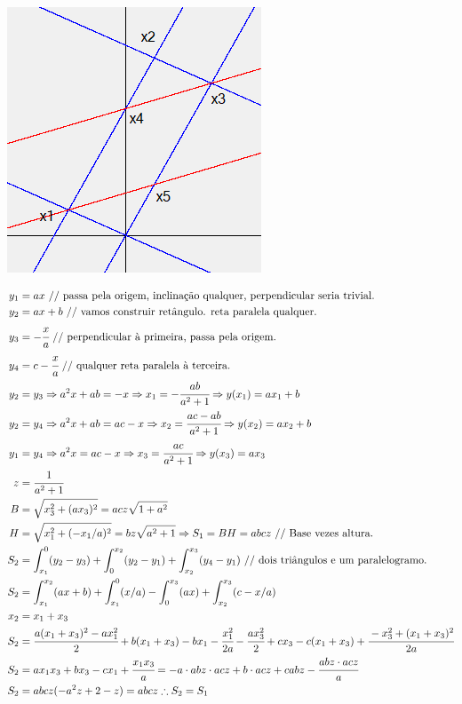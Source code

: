 \documentclass[12pt]{article}
\begin{document}
		\begin{center}
		\includegraphics{restrita}
		\end{center}

\begin{align}
y_1 &= ax \text{ // passa pela origem, inclina\c{c}\~ao qualquer, perpendicular seria trivial.} \\
y_2 &= ax + b \text{ // vamos construir ret\^angulo. reta paralela qualquer.} \\
y_3 &= -\cfrac{x}{a} \text{ // perpendicular \`a primeira, passa pela origem.} \\
y_4 &= c - \cfrac{x}{a} \text{ // qualquer reta paralela \`a terceira.} \\
y_2 &= y_3 \Rightarrow a^2 x + ab = - x \Rightarrow x_1 = -\cfrac{ab}{a^2 + 1} \Rightarrow y(x_1) = ax_1 + b \\
y_2 &= y_4 \Rightarrow a^2 x + ab = ac - x \Rightarrow x_2 = \cfrac{ac - ab}{a^2 + 1} \Rightarrow y(x_2) = ax_2 + b \\
y_1 &= y_4 \Rightarrow a^2 x = ac - x \Rightarrow x_3 = \cfrac{ac}{a^2 + 1} \Rightarrow y(x_3) = ax_3 \\
z &= \cfrac{1}{a^2 + 1} \\
B &= \sqrt{x_3^2 + (ax_3)^2} = acz \sqrt{1 + a^2} \\
H &= \sqrt{x_1^2 + (-x_1/a)^2} = bz \sqrt{a^2 + 1} \Rightarrow S_1 = BH = abcz \text{ // Base vezes altura.} \\
S_2 &= \int_{x_1}^0 (y_2 - y_3) + \int_0^{x_2} (y_2 - y_1) + \int_{x_2}^{x_3} (y_4 - y_1) \text{ // dois tri\^angulos e um paralelogramo.} \\
S_2 &= \int_{x_1}^{x_2} (ax + b) + \int_{x_1}^0 (x/a) - \int_0^{x_3} (ax) + \int_{x_2}^{x_3} (c - x/a) \\
x_2 &= x_1 + x_3 \\
S_2 &= \cfrac{a(x_1 + x_3)^2 - ax_1^2}{2} + b(x_1 + x_3) - bx_1 - \cfrac{x_1^2}{2a} - \cfrac{ax_3^2}{2} + cx_3 - c(x_1 + x_3) + \cfrac{- x_3^2 + (x_1 + x_3)^2}{2a} \\
S_2 &= ax_1x_3 + bx_3 - cx_1 + \cfrac{x_1x_3}{a} = -a\cdot abz\cdot acz + b\cdot acz + cabz - \cfrac{abz\cdot acz}{a} \\
S_2 &= abcz (-a^2z + 2 - z) = abcz \therefore S_2 = S_1
\end{align}
\end{document}
